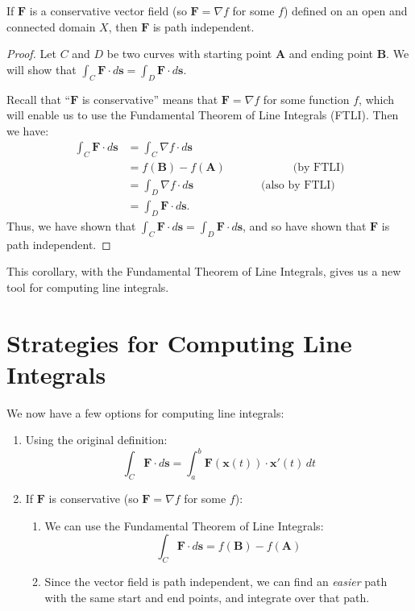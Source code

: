 \documentclass{ximera}
\begin{document}
\begin{corollary}
If $\textbf{F}$ is a conservative vector field (so $\textbf{F}=\nabla f$ for some $f$) defined on an open and connected domain $X$, then $\textbf{F}$ is path independent.
\end{corollary}

\begin{proof}
Let $C$ and $D$ be two curves with starting point $\textbf{A}$ and ending point $\textbf{B}$. We will show that $\int_C\textbf{F}\cdot d\textbf{s}=\int_D\textbf{F}\cdot d\textbf{s}$.

Recall that ``$\textbf{F}$ is conservative'' means that $\textbf{F}=\nabla f$ for some function $f$, which will enable us to use the Fundamental Theorem of Line Integrals (FTLI). Then we have:
\begin{align*}
\int_C\textbf{F}\cdot d\textbf{s} &= \int_C\nabla f\cdot d\textbf{s}\\
&= f(\textbf{B})-f(\textbf{A})\hspace{1in}\textrm{(by FTLI)}\\
&= \int_D\nabla f\cdot d\textbf{s}\hspace{1in}\textrm{(also by FTLI)}\\
&= \int_D\textbf{F}\cdot d\textbf{s}.
\end{align*}
Thus, we have shown that $\int_C\textbf{F}\cdot d\textbf{s}=\int_D\textbf{F}\cdot d\textbf{s}$, and so have shown that $\textbf{F}$ is path independent.
\end{proof}

This corollary, with the Fundamental Theorem of Line Integrals, gives us a new tool for computing line integrals.

\section*{Strategies for Computing Line Integrals}

We now have a few options for computing line integrals:

\begin{enumerate}
\item Using the original definition:
\[
\int_C\textbf{F}\cdot d\textbf{s} = \int_a^b\textbf{F}(\textbf{x}(t))\cdot \textbf{x}'(t)\,dt
\]
\item If $\textbf{F}$ is conservative (so $\textbf{F}=\nabla f$ for some $f$):
\begin{enumerate}
\item We can use the Fundamental Theorem of Line Integrals: 
\[
\int_C\textbf{F}\cdot d\textbf{s} = f(\textbf{B})-f(\textbf{A})
\]
\item Since the vector field is path independent, we can find an \emph{easier} path with the same start and end points, and integrate over that path.
\end{enumerate}
\end{enumerate}
\end{document}
